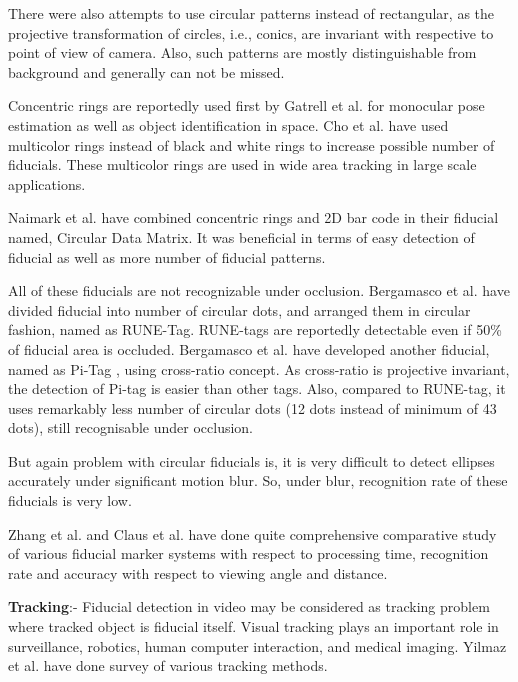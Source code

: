 \documentclass[runningheads]{llncs}
\begin{document}
There were also attempts to use circular patterns instead of rectangular, as
the projective transformation of circles, i.e., conics, are invariant with
respective to point of view of camera\cite{runetag11}. Also, such patterns are
mostly distinguishable from background and generally can not be missed.

Concentric rings are reportedly used first by Gatrell et al.\cite{concentric}
for monocular pose estimation as well as object identification in space. Cho et al.
\cite{Cho:2001}\cite{Cho97fastcolor} have used multicolor rings instead of
black and white rings\cite{concentric} to increase possible number of fiducials.
These multicolor rings are used in wide area tracking in large scale
applications.

Naimark et al. \cite{NaimarkF02} have combined concentric rings and 2D bar code
in their fiducial named, Circular Data Matrix. It was beneficial in terms of
easy detection of fiducial as well as more number of fiducial patterns.

All of these fiducials are not recognizable under occlusion.
Bergamasco et al. \cite{runetag11} have divided fiducial into number of
circular dots, and arranged them in circular fashion, named as RUNE-Tag.
RUNE-tags are reportedly detectable even if 50\% of fiducial area is occluded.
Bergamasco et al. have developed another fiducial, named as Pi-Tag
\cite{Pitag13}, using cross-ratio concept. As cross-ratio is projective
invariant, the detection of Pi-tag is easier than other tags. Also, compared
to RUNE-tag, it uses remarkably less number of circular dots (12 dots instead of
minimum of 43 dots), still recognisable under occlusion.

But again problem with circular fiducials is, it is very difficult to detect
ellipses accurately under significant motion blur. So, under blur, recognition
rate of these fiducials is very low.

Zhang et al.\cite{Zhang:2002} and Claus et al. \cite{ClausF04} have done
quite comprehensive comparative study of various fiducial marker systems with
respect to processing time, recognition rate and accuracy with
respect to viewing angle and distance.

\textbf{Tracking}:-
Fiducial detection in video may be considered as tracking problem where tracked
object is fiducial itself. Visual tracking plays an important role in
surveillance, robotics, human computer interaction, and medical
imaging\cite{Yilmaz:2006}. Yilmaz et al.\cite{Yilmaz:2006} have done survey of
various tracking methods. 
\end{document}
